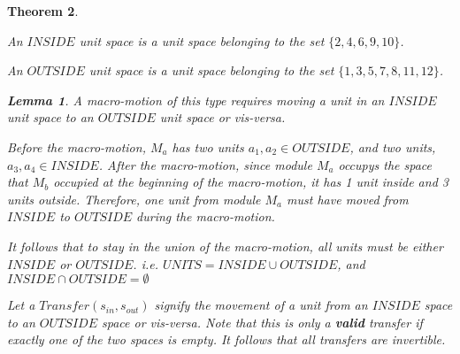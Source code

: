 \documentclass[12pt]{article}
\newtheorem{theorem}{Theorem}[section]
\newtheorem{lemma}[theorem]{Lemma}
\newenvironment{proof}[1][Proof]{\begin{trivlist}
\item[\hskip \labelsep {\bfseries #1}]}{\end{trivlist}}
\newenvironment{definition}[1][Definition]{\begin{trivlist}
\item[\hskip \labelsep {\bfseries #1}]}{\end{trivlist}}
\begin{document}
\begin{theorem}
\begin{definition} An $INSIDE$ unit space is a unit space belonging to the set $\{2,4,6,9,10\}$.
\end{definition}
\begin{definition} An $OUTSIDE$ unit space is a unit space belonging to the set $\{1,3,5,7,8,11,12\}$.
\end{definition}

\begin{lemma} A macro-motion of this type requires moving a unit in an $INSIDE$ unit space to an $OUTSIDE$ unit space or vis-versa.
  \begin{proof} 
    Before the macro-motion, $M_a$ has two units $a_1, a_2 \in OUTSIDE$, 
    and two units, $a_3, a_4 \in INSIDE$. After the macro-motion, since 
    module $M_a$ occupys the space that $M_b$ occupied at the 
    beginning of the macro-motion, it has 1 unit inside and 3 units 
    outside. Therefore, one unit from module $M_a$ must have moved 
    from $INSIDE$ to $OUTSIDE$ during the macro-motion. 
  \end{proof}
\end{lemma}
It follows that to stay in the union of the macro-motion, all units must be either $INSIDE$ or $OUTSIDE$. i.e. $UNITS = INSIDE \cup OUTSIDE$, and $INSIDE \cap OUTSIDE = \emptyset$

\begin{definition} Let a $Transfer(s_{in}, s_{out})$ signify the movement of a unit from an $INSIDE$ space to an $OUTSIDE$ space or vis-versa. Note that this is only a \textbf{valid} transfer if exactly one of the two spaces is empty. It follows that all transfers are invertible. 
\end{definition}


\end{theorem}
\end{document}

